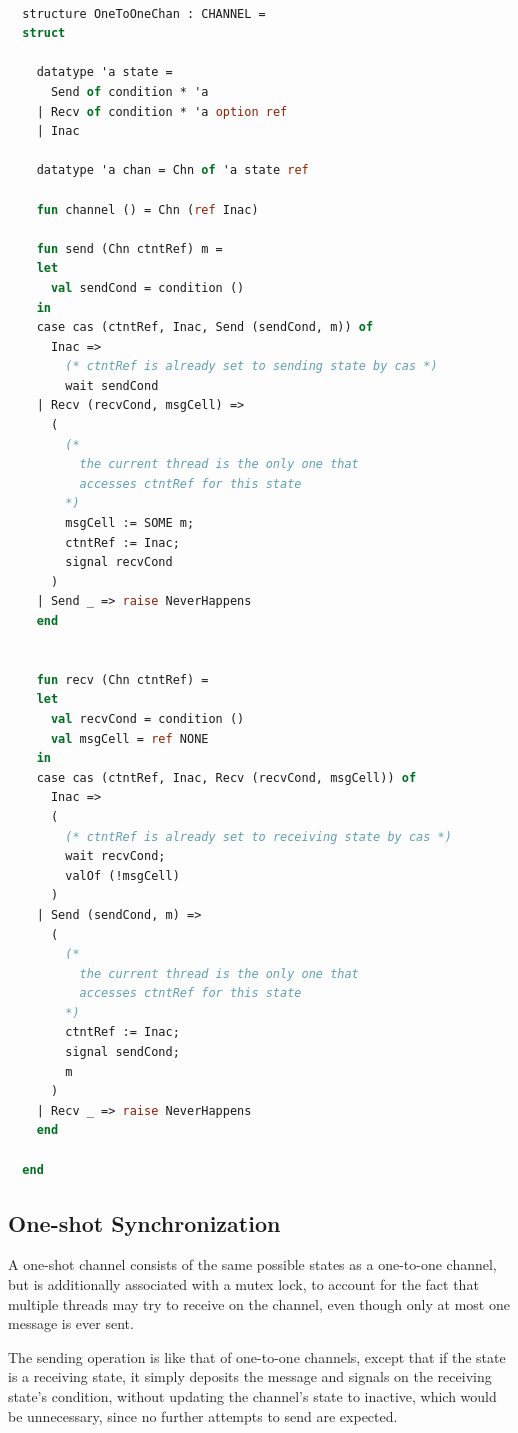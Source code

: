 \documentclass[letterpaper, 11pt]{extarticle}
\begin{document}
\begin{lstlisting}[language=ML, mathescape]

  structure OneToOneChan : CHANNEL =
  struct

    datatype 'a state =
      Send of condition * 'a
    | Recv of condition * 'a option ref
    | Inac  

    datatype 'a chan = Chn of 'a state ref

    fun channel () = Chn (ref Inac)

    fun send (Chn ctntRef) m =
    let
      val sendCond = condition ()
    in
    case cas (ctntRef, Inac, Send (sendCond, m)) of
      Inac => 
        (* ctntRef is already set to sending state by cas *)
        wait sendCond
    | Recv (recvCond, msgCell) =>
      (
        (*
          the current thread is the only one that
          accesses ctntRef for this state
        *)
        msgCell := SOME m;
        ctntRef := Inac;
        signal recvCond
      )
    | Send _ => raise NeverHappens
    end


    fun recv (Chn ctntRef) =
    let
      val recvCond = condition ()
      val msgCell = ref NONE 
    in
    case cas (ctntRef, Inac, Recv (recvCond, msgCell)) of
      Inac =>
      (
        (* ctntRef is already set to receiving state by cas *)
        wait recvCond;
        valOf (!msgCell)
      )
    | Send (sendCond, m) =>
      (
        (*
          the current thread is the only one that
          accesses ctntRef for this state
        *)
        ctntRef := Inac;
        signal sendCond;
        m
      )
    | Recv _ => raise NeverHappens
    end 

  end
\end{lstlisting}

\subsection{One-shot Synchronization}

A one-shot channel consists of the same possible states as a one-to-one channel, but is
additionally associated with a mutex lock, to account for the fact that multiple threads may
try to receive on the channel, even though only at most one message is ever sent.

The sending operation is like that of one-to-one channels,
except that if the state is a receiving state, it simply deposits the message and signals
on the receiving state's condition,
without updating the channel's state to inactive, which would be unnecessary, since
no further attempts to send are expected.
\end{document}
